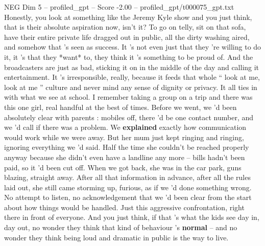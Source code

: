 \begin{textsample}{NEG Dim 5 – profiled\_gpt – Score -2.00 – profiled\_gpt/t000075\_gpt.txt}  \label{ex:f5_neg_021}
Honestly, you look at something like the Jeremy Kyle show and you just think, that is their absolute aspiration now, isn't it?
To go on telly, sit on that sofa, have their entire private life dragged out in public, all the dirty washing aired, and somehow that ’s seen as success.
It ’s not even just that they ’re willing to do it, it ’s that they *want* to, they think it ’s something to be proud of.
And the broadcasters are just as bad, sticking it on in the middle of the day and calling it entertainment.
It ’s irresponsible, really, because it feeds that whole “ look at me, look at me ” culture and never mind any sense of dignity or privacy.
It all ties in with what we see at school.
I remember taking a group on a trip and there was this one girl, real handful at the best of times.
Before we went, we ’d been absolutely clear with parents : mobiles off, there ’d be one contact number, and we ’d call if there was a problem.
We \textbf{explained} exactly how communication would work while we were away.
But her mum just kept ringing and ringing, ignoring everything we ’d said.
Half the time she couldn't be reached properly anyway because she didn't even have a landline any more – bills hadn't been paid, so it ’d been cut off.
When we got back, she was in the car park, guns blazing, straight away.
After all that information in advance, after all the rules laid out, she still came storming up, furious, as if we ’d done something wrong.
No attempt to listen, no acknowledgement that we ’d been clear from the start about how things would be handled.
Just this aggressive confrontation, right there in front of everyone.
And you just think, if that ’s what the kids see day in, day out, no wonder they think that kind of behaviour ’s \textbf{normal} – and no wonder they think being loud and dramatic in public is the way to live.

\end{textsample}
